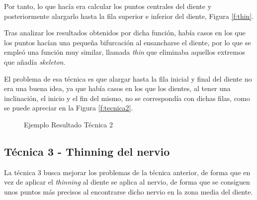 Por tanto, lo que hacía era calcular los puntos centrales del diente y posteriormente alargarlo hasta la fila superior e inferior del diente, Figura \ref{f:thin}.

Tras analizar los resultados obtenidos por dicha función, había casos en los que los puntos hacían una pequeña bifurcación al ensancharse el diente, por lo que se empleó una función muy similar, llamada \emph{thin} que eliminaba aquellos extremos que añadía \emph{skeleton}.

El problema de esa técnica es que alargar hasta la fila inicial y final del diente no era una buena idea, ya que había casos en los que los dientes, al tener una inclinación, el inicio y el fin del mismo, no se correspondía con dichas filas, como se puede apreciar en la Figura \ref{f:tecnica2}.

\begin{figure}[h]
 \centering
 \caption{Ejemplo Resultado Técnica 2}
 \label{f:ejemplo2}
\end{figure}

\subsection{Técnica 3 - Thinning del nervio}
La técnica 3 busca mejorar los problemas de la técnica anterior, de forma que en vez de aplicar el \emph{thinning} al diente se aplica al nervio, de forma que se consiguen unos puntos más precisos al encontrarse dicho nervio en la zona media del diente.

